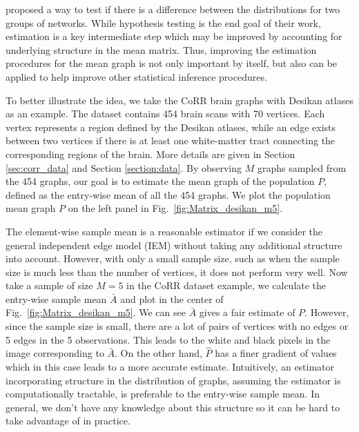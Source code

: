 \documentclass[10pt,letterpaper]{article}
\renewcommand{\hat}{\widehat}
\begin{document}
\citet{ginestet2014hypothesis} proposed a way to test if there is a difference between the distributions for two groups of networks.  
While hypothesis testing is the end goal of their work, estimation is a key intermediate step which may be improved by accounting for underlying structure in the mean matrix. 
Thus, improving the estimation procedures for the mean graph is not only important by itself, but also can be applied to help improve other statistical inference procedures.

To better illustrate the idea, we take the CoRR brain graphs with Desikan atlases as an example. The dataset contains 454 brain scans with 70 vertices. Each vertex represents a region defined by the Desikan atlases, while an edge exists between two vertices if there is at least one white-matter tract connecting the corresponding regions of the brain. More details are given in Section \ref{sec:corr_data} and Section \ref{section:data}. By observing $M$ graphs sampled from the 454 graphs, our goal is to estimate the mean graph of the population $P$, defined as the entry-wise mean of all the 454 graphs. We plot the population mean graph $P$ on the left panel in Fig.~\ref{fig:Matrix_desikan_m5}.

The element-wise sample mean is a reasonable estimator if we consider the general independent edge model (IEM) \citep{bollobas2007phase} without taking any additional structure into account. 
However, with only a small sample size, such as when the sample size is much less than the number of vertices, it does not perform very well.
Now take a sample of size $M=5$ in the CoRR dataset example, we calculate the entry-wise sample mean $\bar{A}$ and plot in the center of Fig.~\ref{fig:Matrix_desikan_m5}. We can see $\bar{A}$ gives a fair estimate of $P$. However, since the sample size is small, there are a lot of pairs of vertices with no edges or 5 edges in the 5 observations. This leads to the white and black pixels in the image corresponding to $\bar{A}$.
On the other hand, $\hat{P}$ has a finer gradient of values which in this case leads to a more accurate estimate.
Intuitively, an estimator incorporating structure in the distribution of graphs, assuming the estimator is computationally tractable, is preferable to the entry-wise sample mean. 
In general, we don't have any knowledge about this structure so it can be hard to take advantage of in practice.
\end{document}
